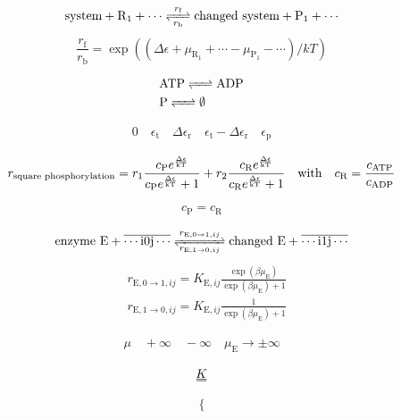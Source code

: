 \documentclass[12pt]{article}
\newcommand{\duf}[2]{\stackunder[0.5pt]{\stackunder[0.8pt]{\stackunder[1pt]{\ensuremath{#1}}{\rule{\widthof{\ensuremath{#2}}*\real{0.9}}{.1ex}}}{\rule{\widthof{\ensuremath{#2}}*\real{0.9}}{.1ex}}}{}}
\newcommand{\du}[1]{\duf{#1}{#1}}
\begin{document}
\begin{equation*}
	\ce{\text{system} + R_1 + {\cdots} <=>[$r_\text{f}$][$r_\text{b}$] \text{changed system} + P_1 + {\cdots}}
\end{equation*}
\begin{equation*}
    \frac{r_\text{f}}{r_\text{b}} = \exp((\Delta\epsilon + \mu_{\text{R}_1} + \cdots - \mu_{\text{P}_1} - \cdots) / \si{kT})
\end{equation*}

\vspace{3em}
\begin{align*}
	 & \ce{\text{ATP} <=> \text{ADP}} \\
	 & \ce{\text{P} <=> \emptyset}
\end{align*}

\vspace{3em}
\begin{align*}
	0 \quad \epsilon_\text{t} \quad \Delta\epsilon_\text{r} \quad \epsilon_\text{t} - \Delta\epsilon_\text{r} \quad \epsilon_\text{p}
\end{align*}

\vspace{3em}
\begin{align*}
    r_\text{square phosphorylation} = r_1 \frac{c_\text{P}e^{\frac{\Delta\epsilon}{\si{kT}}}}{c_\text{P}e^{\frac{\Delta\epsilon}{\si{kT}}}+1} + r_2 \frac{c_\text{R}e^{\frac{\Delta\epsilon}{\si{kT}}}}{c_\text{R}e^{\frac{\Delta\epsilon}{\si{kT}}}+1} \qq{with} c_\text{R}=\frac{c_\text{ATP}}{c_\text{ADP}}
\end{align*}

\vspace{3em}
\begin{align*}
    c_\text{P} = c_\text{R}
\end{align*}

\vspace{3em}
\begin{equation*}
	\ce{\text{enzyme E} + \overline{\cdots i0j \cdots} <=>[$r_{\text{E},0\rightarrow1,ij}$][$r_{\text{E},1\rightarrow0,ij}$] \text{changed E} + \overline{\cdots i1j \cdots}}
\end{equation*}
\begin{align*}
	 & r_{\text{E},0\rightarrow1,ij} = K_{\text{E},ij} \frac{\exp(\beta\mu_\text{E})}{\exp(\beta\mu_\text{E})+1} \\
	 & r_{\text{E},1\rightarrow0,ij} = K_{\text{E},ij} \frac{1}{\exp(\beta\mu_\text{E})+1}
\end{align*}

\vspace{3em}
\begin{align*}
    \mu \quad +\infty \quad -\infty \quad \mu_\text{E} \rightarrow \pm\infty
\end{align*}

\vspace{3em}
\begin{align*}
    \du{K}
\end{align*}

\vspace{3em}
\begin{align*}
    \Biggl\{
\end{align*}
\end{document}
